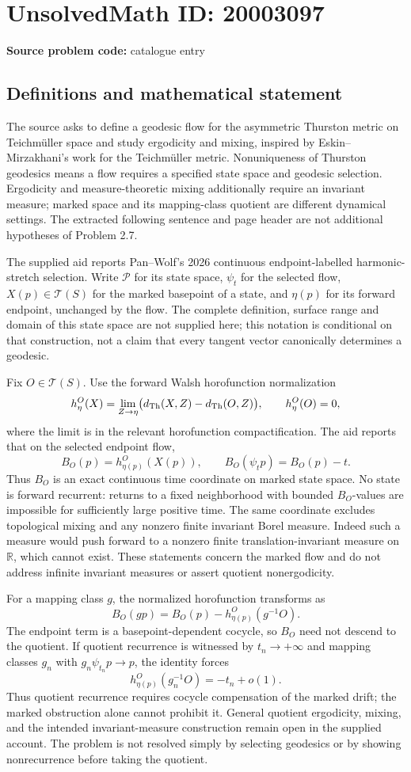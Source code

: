 \documentclass[11pt]{article}
\newcommand{\R}{\mathbb{R}}
\begin{document}
\section*{UnsolvedMath ID: 20003097}
\textbf{Source problem code:} catalogue entry
\subsection{Definitions and mathematical statement}
The source asks to define a geodesic flow for the asymmetric Thurston metric on Teichm\"uller space and study ergodicity and mixing, inspired by Eskin--Mirzakhani's work for the Teichm\"uller metric. Nonuniqueness of Thurston geodesics means a flow requires a specified state space and geodesic selection. Ergodicity and measure-theoretic mixing additionally require an invariant measure; marked space and its mapping-class quotient are different dynamical settings. The extracted following sentence and page header are not additional hypotheses of Problem 2.7.

The supplied aid reports Pan--Wolf's 2026 continuous endpoint-labelled harmonic-stretch selection. Write \(\mathcal P\) for its state space, \(\psi_t\) for the selected flow, \(X(p)\in\mathcal T(S)\) for the marked basepoint of a state, and \(\eta(p)\) for its forward endpoint, unchanged by the flow. The complete definition, surface range and domain of this state space are not supplied here; this notation is conditional on that construction, not a claim that every tangent vector canonically determines a geodesic.

Fix \(O\in\mathcal T(S)\). Use the forward Walsh horofunction normalization
\[
h_\eta^O(X)=\lim_{Z\to\eta}\bigl(d_{\rm Th}(X,Z)-d_{\rm Th}(O,Z)\bigr),\qquad h_\eta^O(O)=0,
\]
where the limit is in the relevant horofunction compactification. The aid reports that on the selected endpoint flow,
\[
B_O(p)=h_{\eta(p)}^O(X(p)),\qquad B_O(\psi_t p)=B_O(p)-t.
\]
Thus \(B_O\) is an exact continuous time coordinate on marked state space. No state is forward recurrent: returns to a fixed neighborhood with bounded \(B_O\)-values are impossible for sufficiently large positive time. The same coordinate excludes topological mixing and any nonzero finite invariant Borel measure. Indeed such a measure would push forward to a nonzero finite translation-invariant measure on \(\R\), which cannot exist. These statements concern the marked flow and do not address infinite invariant measures or assert quotient nonergodicity.

For a mapping class \(g\), the normalized horofunction transforms as
\[
B_O(gp)=B_O(p)-h_{\eta(p)}^O(g^{-1}O).
\]
The endpoint term is a basepoint-dependent cocycle, so \(B_O\) need not descend to the quotient. If quotient recurrence is witnessed by \(t_n\to+\infty\) and mapping classes \(g_n\) with \(g_n\psi_{t_n}p\to p\), the identity forces
\[
h_{\eta(p)}^O(g_n^{-1}O)=-t_n+o(1).
\]
Thus quotient recurrence requires cocycle compensation of the marked drift; the marked obstruction alone cannot prohibit it. General quotient ergodicity, mixing, and the intended invariant-measure construction remain open in the supplied account. The problem is not resolved simply by selecting geodesics or by showing nonrecurrence before taking the quotient.
\end{document}
